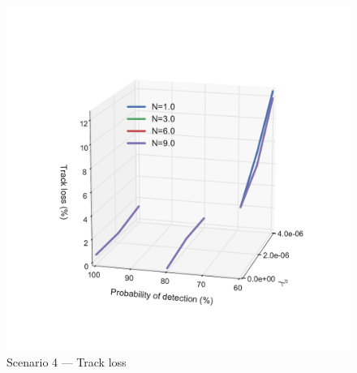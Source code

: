 {\begin{figure}
\includegraphics[height = .45\textheight]{Figures/plots/Scenario4_Tracking-TrackLoss.pdf}
\caption{Scenario 4 --- Track loss}\label{fig:scenario4_track_loss}
\end{figure}

}